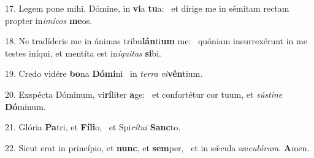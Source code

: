 17. Legem pone mihi, Dómine, in \textbf{vi}a \textbf{tu}a: \ast\  et dírige me in sémitam rectam propter in\textit{i}\textit{mí}\textit{cos} \textbf{me}os.\

18. Ne tradíderis me in ánimas tribu\textbf{lán}ti\textbf{um} me: \ast\  quóniam insurrexérunt in me testes iníqui, et mentíta est in\textit{í}\textit{qui}\textit{tas} \textbf{si}bi.\

19. Credo vidére \textbf{bo}na \textbf{Dó}\textbf{mi}ni \ast\  in \textit{ter}\textit{ra} \textit{vi}\textbf{vén}tium.\

20. Exspécta Dóminum, vi\textbf{rí}liter \textbf{a}ge: \ast\  et confortétur cor tuum, et \textit{sús}\textit{ti}\textit{ne} \textbf{Dó}minum.\

21. Glória \textbf{Pa}tri, et \textbf{Fí}\textbf{li}o, \ast\  et Spi\textit{rí}\textit{tu}\textit{i} \textbf{Sanc}to.\

22. Sicut erat in princípio, et \textbf{nunc}, et \textbf{sem}per, \ast\  et in sǽcula sæ\textit{cu}\textit{ló}\textit{rum}. \textbf{A}men.\


